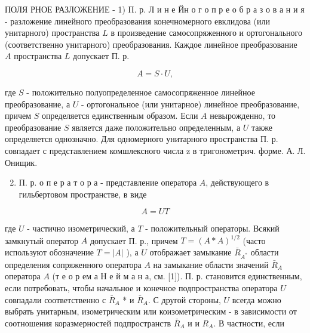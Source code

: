 \documentclass[10pt]{article}
\begin{document}
ПОЛЯ РНОЕ РАЗЛОЖЕНИЕ - 1) П. р. Л и н е Йн о г о п р е о б р а з о в а н и я - разложение линейного преобразования конечномерного евклидова (или унитарного) пространства $L$ в произведение самосопряженного и ортогонального (соответственно унитарного) преобразования. Каждое линейное преобразование $A$ пространства $L$ допускает П. р.



\[

A=S \cdot U,

\]



где $S$ - положительно полуопределенное самосопряженное линейное преобразование, а $U$ - ортогональное (или унитарное) линейное преобразование, причем $S$ определяется единственным образом. Если $A$ невырожденно, то преобразование $S$ является даже положительно определенным, а $U$ также определяется однозначно. Для одномерного унитарного пространства П. р. совпадает с представлением комшлексного числа z в тригонометрич. форме. А. Л. Онищик.



\begin{enumerate}

  \setcounter{enumi}{1}

  \item П. р. о п е р а т о р а - представление оператора $A$, действующего в гильбертовом пространстве, в виде

\end{enumerate}



\[

A=U T

\]



где $U$ - частично изометрический, а $T$ - положительный операторы. Всякий замкнутый оператор $A$ допускает П. р., причем $T=(A * A)^{1 / 2}$ (часто используют обозначение $T=|A|$ ), а $U$ отображает замыкание $\bar{R}_{A^{*}}$ области определения сопряженного оператора $A$ на замыкание области значений $\bar{R}_{A}$ оператора $A$ (т е о р ем а Н е й м а н а, см. [1]). П. р. становится единственным, если потребовать, чтобы начальное и конечное подпространства оператора $U$ совпадали соответственно с $\bar{R}_{A}$ * и $\bar{R}_{A}$. С другой стороны, $U$ всегда можно выбрать унитарным, изометрическим или коизометрическим - в зависимости от соотношения коразмерностей подпространств $\bar{R}_{A}$ и и $R_{A}$. В частности, если
\end{document}
